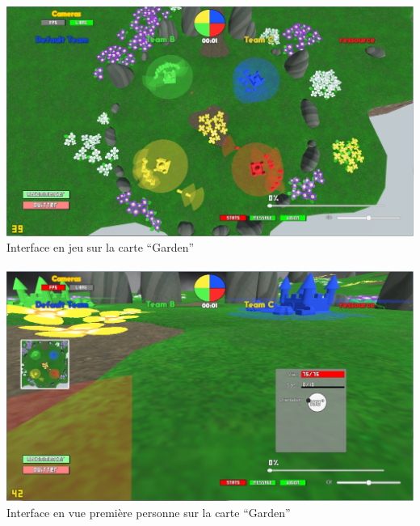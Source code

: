 \documentclass{report}
\begin{document}
\paragraph{}


\paragraph{}
\begin{adjustwidth}{-3em}{-3em}
\begin{center}
\includegraphics[scale=0.3]{DATA/enjeu.png}
 {Interface en jeu sur la carte “Garden”}
\end{center}
\end{adjustwidth}
\paragraph{}

\paragraph{}
\begin{adjustwidth}{-3em}{-3em}
\begin{center}
\includegraphics[scale=0.3]{DATA/enjeufps.png}
 {Interface en vue première personne sur la carte “Garden”}
\end{center}
\end{adjustwidth}
\end{document}
